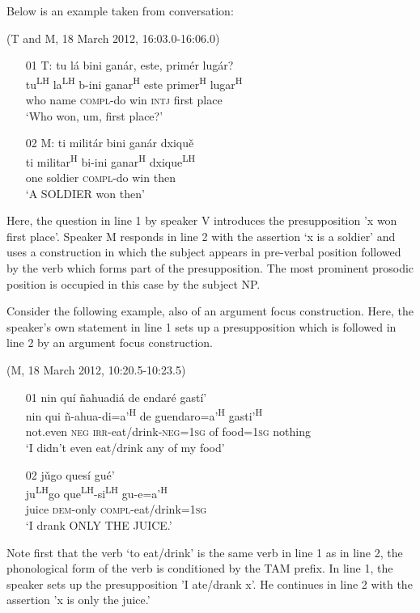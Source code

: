 Below is an example taken from conversation:

\ea(T and M, 18 March 2012, 16:03.0-16:06.0)
\begin{itemize}
\item[01 T:]
\glll tu l\'{a} bini gan\'{a}r, este, prim\'{e}r lug\'{a}r? \\
tu\textsuperscript{LH} la\textsuperscript{LH} b-ini ganar\textsuperscript{H} este primer\textsuperscript{H} lugar\textsuperscript{H} \\
who name \textsc{compl}-do win \textsc{intj} first place  \\
\glt `Who won, um, first place?'


\item[02 M:]
\glll ti milit\'{a}r bini gan\'{a}r dxiqu\v{e} \\
ti militar\textsuperscript{H} bi-ini ganar\textsuperscript{H} dxique\textsuperscript{LH} \\
one soldier \textsc{compl}-do win then \\
\glt `A SOLDIER won then' 


\end{itemize}
\z
Here, the question in line 1 by speaker V introduces the presupposition 'x won first place'. Speaker M responds in line 2 with the assertion `x is a soldier' and uses a construction in which the subject appears in pre-verbal position followed by the verb which forms part of the presupposition. The most prominent prosodic position is occupied in this case by the subject NP.

Consider the following example, also of an argument focus construction. Here, the speaker's own statement in line 1 sets up a presupposition which is followed in line 2 by an argument focus construction.  

\ea\label{jugoquesigue}(M, 18 March 2012, 10:20.5-10:23.5)
\begin{itemize}
\item [01]
\glll nin qu\'{i} \~{n}ahuadi\'{a} de endar\'{e} gast\'{i}' \\
nin qui \~{n}-ahua-di=a'\textsuperscript{H} de guendaro=a'\textsuperscript{H} gasti'\textsuperscript{H}  \\
not.even \textsc{neg} \textsc{irr}-eat/drink-\textsc{neg}=\textsc{1sg} of food=\textsc{1sg} nothing \\
\glt `I didn't even eat/drink any of my food'


\item [02]
\glll j\v{u}go ques\'{i} gu\'{e}' \\
ju\textsuperscript{LH}go que\textsuperscript{LH}-si\textsuperscript{LH} gu-e=a'\textsuperscript{H} \\
juice \textsc{dem}-only \textsc{compl}-eat/drink=\textsc{1sg} \\
\glt `I drank ONLY THE JUICE.'  

\end{itemize}
\z
Note first that the verb `to eat/drink' is the same verb in line 1 as in line 2, the phonological form of the verb is conditioned by the TAM prefix. In line 1, the speaker sets up the presupposition 'I ate/drank x'. He continues in line 2 with the assertion 'x is only the juice.'  

